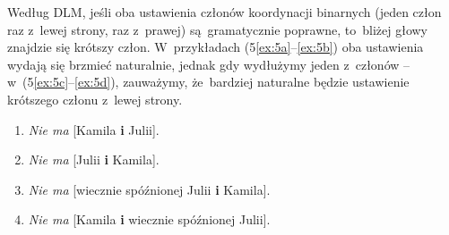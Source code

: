 \documentclass[licencjacka]{pracamgr_Kogni}
\begin{document}
Według DLM, jeśli oba ustawienia członów koordynacji binarnych (jeden człon raz z~lewej strony, raz z~prawej) są~gramatycznie poprawne, to~bliżej głowy znajdzie się krótszy człon. W~przykładach (5\ref{ex:5a}--\ref{ex:5b}) oba ustawienia wydają się brzmieć naturalnie, jednak gdy wydłużymy jeden z~członów -- w~(5\ref{ex:5c}--\ref{ex:5d}), zauważymy, że~bardziej naturalne będzie ustawienie krótszego członu z~lewej strony.
\begin{exe}
    \ex
    \begin{enumerate}
        \item {\textit{Nie ma} [Kamila \textbf{i} Julii].
            \label{ex:5a}}
        \item {\textit{Nie ma} [Julii \textbf{i} Kamila].
            \label{ex:5b}}
        \item {\textit{Nie ma} [wiecznie spóźnionej Julii \textbf{i} Kamila].
            \label{ex:5c}}
        \item {\textit{Nie ma} [Kamila \textbf{i} wiecznie spóźnionej Julii].
            \label{ex:5d}}
    \end{enumerate}
    \label{ex:5}
\end{exe}
\setcounter{mpFootnoteValueSaver}{\value{footnote}}
\end{document}
